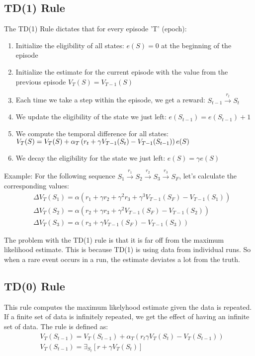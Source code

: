\documentclass{article}
\begin{document}
\subsection{TD(1) Rule}
The TD(1) Rule dictates that for every episode 'T' (epoch):
\begin{enumerate}
  \item Initialize the eligibility of all states: $e(S) = 0$ at the beginning of the episode
  \item Initialize the estimate for the current episode with the value from the previous episode $V_T(S) = V_{T - 1}(S)$
  \item Each time we take a step within the episode, we get a reward: $S_{t - 1} \xrightarrow{r_t} S_t$
  \item We update the eligibility of the state we just left: $e(S_{t - 1}) = e(S_{t - 1}) + 1$
  \item We compute the temporal difference for all states: $V_T(S) = V_T(S) + \newline \alpha_T \left( r_t + \gamma V_{T - 1}(S_t) - V_{T - 1}(S_{t - 1}) \right) e(S)$
  \item We decay the eligibility for the state we just left: $e(S) = \gamma e(S)$
\end{enumerate}
\begin{framed}
  Example:
  For the following sequence $S_1 \xrightarrow{r_1} S_2 \xrightarrow{r_2} S_3 \xrightarrow{r_3} S_F$, let's calculate the corresponding values:
  \begin{align*}
    &\Delta V_T(S_1) = \alpha \left( r_1 + \gamma r_2 + \gamma^2 r_3 + \gamma^3 V_{T - 1} (S_F) - V_{T - 1} (S_1) \right) \\
    &\Delta V_T(S_2) = \alpha \left( r_2 + \gamma r_3 + \gamma^2 V_{T - 1} (S_F) - V_{T - 1} (S_2) \right) \\
    &\Delta V_T(S_3) = \alpha \left( r_3 + \gamma V_{T - 1} (S_F) - V_{T - 1} (S_3) \right)
  \end{align*}
\end{framed}
The problem with the TD(1) rule is that it is far off from the maximum likelihood estimate. This is because TD(1) is using data from individual runs. So when a rare event occurs in a run, the estimate deviates a lot from the truth.
\subsection{TD(0) Rule}
This rule computes the maximum likelyhood estimate given the data is repeated. If a finite set of data is infinitely repeated, we get the effect of having an infinite set of data. The rule is defined as:
\begin{align*}
  &V_T(S_{t - 1}) = V_T(S_{t - 1}) + \alpha_T \left( r_t \gamma V_T(S_t) - V_T(S_{t - 1}) \right) \\
  &V_T(S_{t - 1}) = \exists_{S_t} \left[ r + \gamma V_T(S_t) \right]
\end{align*}
\end{document}
